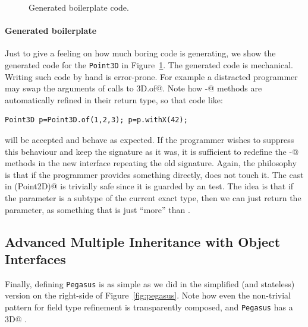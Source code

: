 


\begin{figure}
\caption{Generated boilerplate code.}
\label{fig:boilerplate}
\end{figure}

\paragraph{Generated boilerplate}
Just to give a feeling on how much boring code \mixin is generating, we show the
generated code for the \texttt{Point3D} in Figure~\ref{fig:boilerplate}. The
generated code is mechanical. Writing such code by hand is error-prone. For
example a distracted programmer may swap the arguments of calls to
\Q@Point3D.of@.  Note how \Q@with-@ methods are automatically refined in their
return type, so that code like: 

\begin{lstlisting}
Point3D p=Point3D.of(1,2,3); p=p.withX(42);
\end{lstlisting}

\noindent will be accepted and behave as expected. If the programmer wishes to suppress
this behaviour and keep the signature as it was, it is sufficient to redefine
the \Q@with-@ methods in the new interface repeating the old signature.  Again,
the philosophy is that if the programmer provides something directly, \mixin
does not touch it.  The cast in \Q@with(Point2D)@ is trivially safe since it is
guarded by an \Q@instanceof@ test. The idea is that if the parameter is a
subtype of the current exact type, then we can just return the parameter, as
something that is just ``more'' than \Q@this@.

\subsection{Advanced Multiple Inheritance with Object Interfaces}
Finally, defining \texttt{Pegasus} is as simple as we did in the simplified
(and stateless) version on the right-side of Figure~\ref{fig:pegasus}.
 Note how even the non-trivial pattern for field type refinement is
transparently composed, and \texttt{Pegasus} has a \Q@Point3D@
\Q@location@.%

